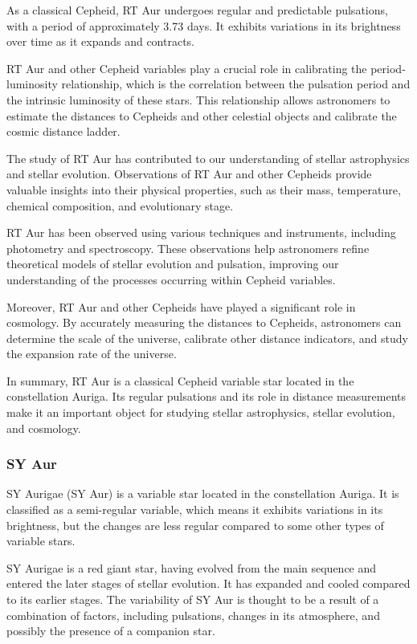 As a classical Cepheid, RT Aur undergoes regular and predictable pulsations, with a period of approximately 3.73 days. It exhibits variations in its brightness over time as it expands and contracts.

RT Aur and other Cepheid variables play a crucial role in calibrating the period-luminosity relationship, which is the correlation between the pulsation period and the intrinsic luminosity of these stars. This relationship allows astronomers to estimate the distances to Cepheids and other celestial objects and calibrate the cosmic distance ladder.

The study of RT Aur has contributed to our understanding of stellar astrophysics and stellar evolution. Observations of RT Aur and other Cepheids provide valuable insights into their physical properties, such as their mass, temperature, chemical composition, and evolutionary stage.

RT Aur has been observed using various techniques and instruments, including photometry and spectroscopy. These observations help astronomers refine theoretical models of stellar evolution and pulsation, improving our understanding of the processes occurring within Cepheid variables.

Moreover, RT Aur and other Cepheids have played a significant role in cosmology. By accurately measuring the distances to Cepheids, astronomers can determine the scale of the universe, calibrate other distance indicators, and study the expansion rate of the universe.

In summary, RT Aur is a classical Cepheid variable star located in the constellation Auriga. Its regular pulsations and its role in distance measurements make it an important object for studying stellar astrophysics, stellar evolution, and cosmology.

\subsubsection*{ SY Aur }
SY Aurigae (SY Aur) is a variable star located in the constellation Auriga. It is classified as a semi-regular variable, which means it exhibits variations in its brightness, but the changes are less regular compared to some other types of variable stars.

SY Aurigae is a red giant star, having evolved from the main sequence and entered the later stages of stellar evolution. It has expanded and cooled compared to its earlier stages. The variability of SY Aur is thought to be a result of a combination of factors, including pulsations, changes in its atmosphere, and possibly the presence of a companion star.

